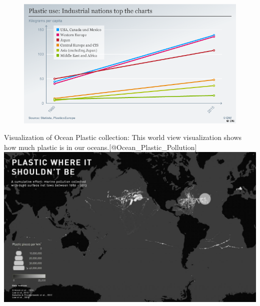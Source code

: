 \documentclass[]{book}
\theoremstyle{definition}
\theoremstyle{definition}
\theoremstyle{definition}
\theoremstyle{remark}
\begin{document}
\begin{figure}
\centering
\includegraphics{images/plastic_use.png}
\caption{}
\end{figure}

Visualization of Ocean Plastic collection: This world view visualization
shows how much plastic is in our oceans.{[}@Ocean\_Plastic\_Pollution{]}
\includegraphics{images/Ocean_Plasticpollution.jpg}
\end{document}
